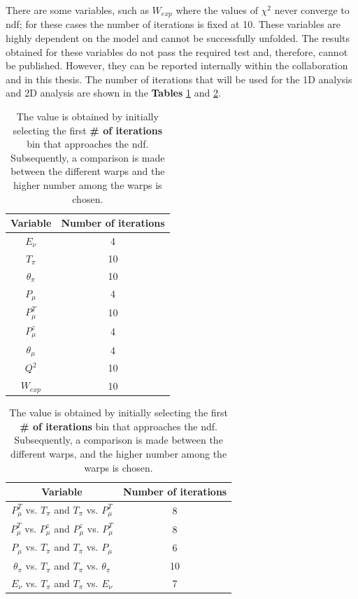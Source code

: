 There are some variables, such as $W_{exp}$ where the values of $\chi^2$ never converge to ndf; for these cases the number of iterations is fixed at 10. These variables are highly dependent on the model and cannot be successfully unfolded. The results obtained for these variables do not pass the required test and, therefore, cannot be published. However, they can be reported internally within the collaboration and in this thesis. The number of iterations that will be used for the 1D analysis and 2D analysis are shown in the \textbf{Tables} \ref{tab:Analysis:Unfolding:1DIterations} and \ref{tab:Analysis:Unfolding:2DIterations}.
\begin{table}[!htb]
    \centering
    \begin{tabular}{c|c}
        Variable & Number of iterations \\ \hline
        $E_\nu$  & 4\\
        $T_\pi$  & 10\\
        $\theta_\pi$ & 10\\
        $P_\mu$ & 4\\
        $P^T_\mu$ & 10\\
        $P^z_\mu$ & 4\\
        $\theta_\mu$ & 4 \\
        $Q^2$ & 10\\
        $W_{exp}$ & 10
    \end{tabular}
    \caption{The value is obtained by initially selecting the first \textbf{\# of iterations} bin that approaches the ndf. Subsequently, a comparison is made between the different warps and the higher number among the warps is chosen.}
    \label{tab:Analysis:Unfolding:1DIterations}
\end{table}

\begin{table}[!htb]
    \centering
    \begin{tabular}{c|c}
        Variable & Number of iterations \\ \hline
        $P^T_\mu$ vs. $T_\pi$ and $T_\pi$ vs. $P^T_\mu$ & 8\\
        $P^T_\mu$ vs. $P^z_\mu$ and $P^z_\mu$ vs. $P^T_\mu$ & 8\\
        $P_\mu$ vs. $T_\pi$ and $T_\pi$ vs. $P_\mu$ & 6\\
        $\theta_\pi$ vs. $T_\pi$ and $T_\pi$ vs. $\theta_\pi$ & 10\\
        $E_\nu$ vs. $T_\pi$ and $T_\pi$ vs. $E_\nu$ & 7
    \end{tabular}
    \caption{The value is obtained by initially selecting the first \textbf{\# of iterations} bin that approaches the ndf. Subsequently, a comparison is made between the different warps, and the higher number among the warps is chosen.}
    \label{tab:Analysis:Unfolding:2DIterations}
\end{table}

